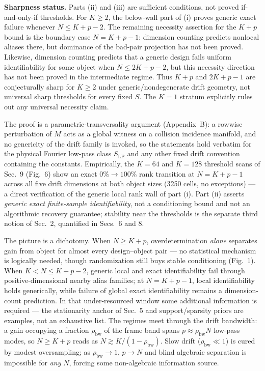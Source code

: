 \noindent\textbf{Sharpness status.} Parts (ii) and (iii) are sufficient conditions, not proved if-and-only-if thresholds. For $K\ge2$, the below-wall part of (i) proves generic exact failure whenever $N\le K+p-2$. The remaining necessity assertion for the $K+p$ bound is the boundary case $N=K+p-1$: dimension counting predicts nonlocal aliases there, but dominance of the bad-pair projection has not been proved. Likewise, dimension counting predicts that a generic design fails uniform identifiability for some object when $N\le2K+p-2$, but this necessity direction has not been proved in the intermediate regime. Thus $K+p$ and $2K+p-1$ are conjecturally sharp for $K\ge2$ under generic/nondegenerate drift geometry, not universal sharp thresholds for every fixed $S$. The $K=1$ stratum explicitly rules out any universal necessity claim.

The proof is a parametric-transversality argument (Appendix~B): a rowwise perturbation of $M$ acts as a global witness on a collision incidence manifold, and no genericity of the drift family is invoked, so the statements hold verbatim for the physical Fourier low-pass class $S_{\mathrm{LP}}$ and any other fixed drift convention containing the constants. Empirically, the $K=64$ and $K=128$ threshold scans of Sec.~9 (Fig.~6) show an exact $0\%\to100\%$ rank transition at $N=K+p-1$ across all five drift dimensions at both object sizes (3250 cells, no exceptions) --- a direct verification of the generic local rank wall of part (i). Part (ii) asserts \emph{generic exact finite-sample identifiability}, not a conditioning bound and not an algorithmic recovery guarantee; stability near the thresholds is the separate third notion of Sec.~2, quantified in Secs.~6 and 8.

The picture is a dichotomy. When $N\ge K+p$, overdetermination \emph{alone} separates gain from object for almost every design--object pair --- no statistical mechanism is logically needed, though randomization still buys stable conditioning (Fig.~1). When $K<N\le K+p-2$, generic local and exact identifiability fail through positive-dimensional nearby alias families; at $N=K+p-1$, local identifiability holds generically, while failure of global exact identifiability remains a dimension-count prediction. In that under-resourced window some additional information is required --- the stationarity anchor of Sec.~5 and support/sparsity priors are examples, not an exhaustive list. The regimes meet through the drift bandwidth: a gain occupying a fraction $\rho_{\mathrm{bw}}$ of the frame band spans $p\approx \rho_{\mathrm{bw}}N$ low-pass modes, so $N\ge K+p$ reads as $N \gtrsim K/(1-\rho_{\mathrm{bw}})$. Slow drift ($\rho_{\mathrm{bw}}\ll1$) is cured by modest oversampling; as $\rho_{\mathrm{bw}}\to1$, $p\to N$ and blind algebraic separation is impossible for \emph{any} $N$, forcing some non-algebraic information source.

